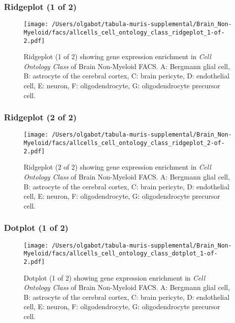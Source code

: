 \clearpage

\subsubsection{Ridgeplot (1 of 2)}
\begin{figure}[h]
\centering
\texttt{[image: /Users/olgabot/tabula-muris-supplemental/Brain\_Non-Myeloid/facs/allcells\_cell\_ontology\_class\_ridgeplot\_1-of-2.pdf]}

\caption{ Ridgeplot (1 of 2)  showing gene expression enrichment in \emph{Cell Ontology Class} of Brain Non-Myeloid FACS. A: Bergmann glial cell, B: astrocyte of the cerebral cortex, C: brain pericyte, D: endothelial cell, E: neuron, F: oligodendrocyte, G: oligodendrocyte precursor cell.}
\end{figure}


\clearpage

\subsubsection{Ridgeplot (2 of 2)}
\begin{figure}[h]
\centering
\texttt{[image: /Users/olgabot/tabula-muris-supplemental/Brain\_Non-Myeloid/facs/allcells\_cell\_ontology\_class\_ridgeplot\_2-of-2.pdf]}

\caption{ Ridgeplot (2 of 2)  showing gene expression enrichment in \emph{Cell Ontology Class} of Brain Non-Myeloid FACS. A: Bergmann glial cell, B: astrocyte of the cerebral cortex, C: brain pericyte, D: endothelial cell, E: neuron, F: oligodendrocyte, G: oligodendrocyte precursor cell.}
\end{figure}


\clearpage

\subsubsection{Dotplot (1 of 2)}
\begin{figure}[h]
\centering
\texttt{[image: /Users/olgabot/tabula-muris-supplemental/Brain\_Non-Myeloid/facs/allcells\_cell\_ontology\_class\_dotplot\_1-of-2.pdf]}

\caption{ Dotplot (1 of 2)  showing gene expression enrichment in \emph{Cell Ontology Class} of Brain Non-Myeloid FACS. A: Bergmann glial cell, B: astrocyte of the cerebral cortex, C: brain pericyte, D: endothelial cell, E: neuron, F: oligodendrocyte, G: oligodendrocyte precursor cell.}
\end{figure}


